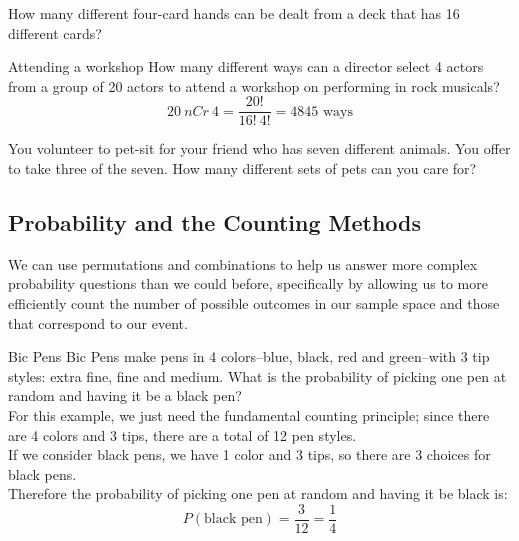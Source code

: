 \begin{try}
How many different four-card hands can be dealt from a deck that has 16
different cards?
\end{try}

\begin{example}[https://www.youtube.com/watch?v=LnFSPX3VKXM]{Attending a workshop}
How many different ways can a director select 4 actors from a group of 20
actors to attend a workshop on performing in rock musicals?\\

\sol
\[20\ nCr\ 4 = \dfrac{20!}{16! \ 4!} = 4845 \textrm{ ways}\]
\end{example}

\begin{try}
You volunteer to pet-sit for your friend who has seven different animals. You
offer to take three of the seven. How many different sets of pets can you care for?
\end{try}

\subsection{Probability and the Counting Methods}
We can use permutations and combinations to help us answer more complex probability questions than we could before, specifically by allowing us to more efficiently count the number of possible outcomes in our sample space and those that correspond to our event.

\begin{example}[https://www.youtube.com/watch?v=d0PaAz2Ro4k]{Bic Pens}
Bic Pens make pens in 4 colors--blue, black, red and green--with 3 tip styles: extra fine, fine and medium. What is the probability of picking one pen at random and having
it be a black pen? \\

  For this example, we just need the fundamental counting principle; since there are 4 colors and 3 tips, there are a total of 12 pen styles.\\

If we consider black pens, we have 1 color and 3 tips, so there are 3 choices for black pens.\\

Therefore the probability of picking one pen at random and having
it be black is:
\[   P(\mbox{black pen} ) = \frac{3}{12} = \frac{1}{4} \]
\end{example}

